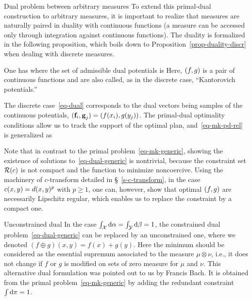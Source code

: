 \begin{rem2}{Dual problem between arbitrary measures}
	To extend this primal-dual construction to arbitrary measures, it is important to realize that measures are naturally paired in duality with continuous functions (a measure can be accessed only through integration against continuous functions). The duality is formalized in the following proposition, which boils down to Proposition~\ref{prop-duality-discr} when dealing with discrete measures.

	\begin{prop}
	One has
	where the set of admissible dual potentials is
	Here, $(f,g)$ is a pair of continuous functions and are also called, as in the discrete case, ``Kantorovich potentials.''
	\end{prop}


	The discrete case~\eqref{eq-dual} corresponds to the dual vectors being samples of the continuous potentials, \ie $(\mathrm{\textbf{f}}_i,\mathrm{\textbf{g}}_j)=(f(x_i),g(y_j))$.
	The primal-dual optimality conditions allow us to track the support of the optimal plan, and~\eqref{eq-mk-pd-rel} is generalized as

	Note that in contrast to the primal problem~\eqref{eq-mk-generic}, showing the existence of solutions to~\eqref{eq-dual-generic} is nontrivial, because the constraint set $\mathcal{R}(c)$ is not compact and the function to minimize noncoercive.
	Using the machinery of $c$-transform detailed in \S~\ref{s-c-transform}, in the case $c(x,y)=d(x,y)^p$ with $p\geq 1$, one can, however, show that optimal $(f,g)$ are necessarily Lipschitz regular, which enables us to replace the constraint by a compact one.
\end{rem2}

\begin{rem2}{Unconstrained dual}\label{rem-uncons-dual}
In the case $\int_{\mathcal{X}} \mathrm{d}\alpha=\int_{\mathcal{Y}}\mathrm{d}\beta = 1$, the constrained dual problem~\eqref{eq-dual-generic} can be replaced by an unconstrained one,
where we denoted $(f\oplus g)(x,y)=f(x)+g(y)$. Here the minimum should be considered as the essential supremum associated to the measure $\mu \otimes \nu$, i.e., it does not change if $f$ or $g$ is modified on sets of zero measure for $\mu$ and $\nu$.
%
This alternative dual formulation was pointed out to us by Francis Bach.
%
It is obtained from the primal problem~\eqref{eq-mk-generic} by adding the redundant constraint $\int \mathrm{d}\pi=1$.
\end{rem2}


